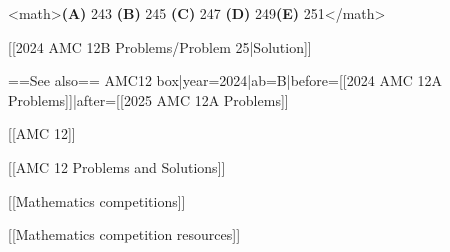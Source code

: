 <math>\textbf{(A) } 243 \qquad \textbf{(B) } 245 \qquad \textbf{(C) } 247 \qquad \textbf{(D) } 249\qquad \textbf{(E) } 251</math>

[[2024 AMC 12B Problems/Problem 25|Solution]]

==See also==
{{AMC12 box|year=2024|ab=B|before=[[2024 AMC 12A Problems]]|after=[[2025 AMC 12A Problems]]}}

[[AMC 12]]

[[AMC 12 Problems and Solutions]]

[[Mathematics competitions]]

[[Mathematics competition resources]]